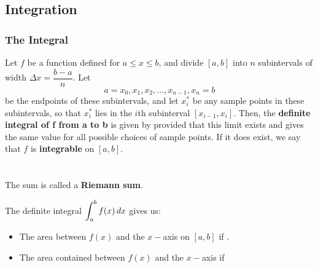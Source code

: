 \documentclass[notes]{subfiles}
\begin{document}
	\subsection*{Integration}
	\subsubsection*{The Integral}
		\begin{defn}
			Let $f$ be a function defined for $a\leq x\leq b$, and divide $[a,b]$ into $n$ subintervals of width $\Delta x = \dfrac{b-a}{n}$.  Let 
				\[a=x_0,x_1,x_2,...,x_{n-1},x_n=b\]
			be the endpoints of these subintervals, and let $x_i^*$ be any sample points in these subintervals, so that $x_i^*$ lies in the $i$th subinterval $[x_{i-1},x_i]$.  Then, the \textbf{definite integral of f from a to b} is given by
			provided that this limit exists and gives the same value for all possible choices of sample points.  If it does exist, we say that $f$ is \textbf{integrable} on $[a,b]$.\\ \\ \\
			
			The sum 
			is called a \textbf{Riemann sum}.  		
		\end{defn}
		\begin{rmk}
			The definite integral $\displaystyle \int_a^b f(x)\, dx$ gives us:\\[10pt]
			\begin{itemize}
			\setlength\itemsep{15pt}
			
			\item The area between $f(x)$ and the $x-$axis on $[a,b]$ if .
			\item The  area contained between $f(x)$ and the $x-$axis if 
			\end{itemize}
			\\
		\end{rmk}
			\newpage
	
\end{document}

